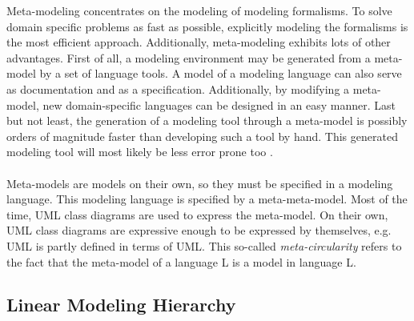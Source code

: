 Meta-modeling concentrates on the modeling of modeling formalisms. To solve domain specific problems as fast as possible, explicitly modeling the formalisms is the most efficient approach. Additionally, meta-modeling exhibits lots of other advantages. First of all, a modeling environment may be generated from a meta-model by a set of language tools. A model of a modeling language can also serve as documentation and as a specification. Additionally, by modifying a meta-model, new domain-specific languages can be designed in an easy manner. Last but not least, the generation of a modeling tool through a meta-model is possibly orders of magnitude faster than developing such a tool by hand. This generated modeling tool will most likely be less error prone too \cite{CAMPaM}. \\ \\
Meta-models are models on their own, so they must be specified in a modeling language. This modeling language is specified by a meta-meta-model. Most of the time, UML class diagrams are used to express the meta-model. On their own, UML class diagrams are expressive enough to be expressed by themselves, e.g. UML is partly defined in terms of UML. This so-called \textit{meta-circularity} refers to the fact that the meta-model of a language L is a model in language L.

\subsection{Linear Modeling Hierarchy}


